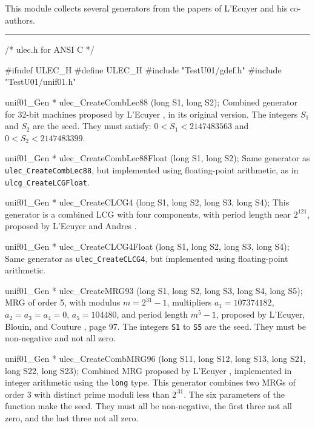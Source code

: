 
This module collects several generators from the papers of
L'Ecuyer and his co-authors.

\bigskip
\hrule
\code
\hide
/*  ulec.h  for ANSI C  */

#ifndef ULEC_H
#define ULEC_H
\endhide
#include "TestU01/gdef.h"
#include "TestU01/unif01.h"


unif01_Gen * ulec_CreateCombLec88 (long S1, long S2);
\endcode
 \tab  Combined generator for 32-bit machines proposed by
  L'Ecuyer \cite{rLEC88a}, in its original version.
%
  The integers $S_1$ and $S_2$ are the seed.
  They must satisfy: $0 < S_1 < 2147483563$ and $0 < S_2 < 2147483399$.
 \endtab
\code


unif01_Gen * ulec_CreateCombLec88Float (long S1, long S2);
\endcode
 \tab  Same generator as {\tt ulec\_CreateCombLec88},
  but implemented using floating-point arithmetic, as in
  {\tt ulcg\_CreateLCGFloat}.
 \endtab
\code


unif01_Gen * ulec_CreateCLCG4 (long S1, long S2, long S3, long S4);
\endcode
 \tab  This generator is a combined LCG with four components,
%
  with period length near $2^{121}$,
  proposed by L'Ecuyer and Andres \cite{rLEC97d}.
 \endtab
\code


unif01_Gen * ulec_CreateCLCG4Float (long S1, long S2, long S3, long S4);
\endcode
 \tab  Same generator as {\tt ulec\_CreateCLCG4},
  but implemented using floating-point arithmetic.
 \endtab
\code


unif01_Gen * ulec_CreateMRG93 (long S1, long S2, long S3, long S4, long S5);
\endcode
 \tab  MRG of order 5, with modulus $m=2^{31}-1$, multipliers
   $a_1 = 107374182$, $a_2 = a_3 = a_4 = 0$, $a_5 = 104480$,
   and period length $m^5-1$, proposed by
  L'Ecuyer, Blouin, and Couture \cite{rLEC93a}, page 97.
%
  The integers {\tt S1} to {\tt S5} are the seed.
  They must be non-negative and not all zero.
 \endtab
\code


unif01_Gen * ulec_CreateCombMRG96 (long S11, long S12, long S13,
                                   long S21, long S22, long S23);
\endcode
 \tab  Combined MRG proposed by L'Ecuyer \cite{rLEC96b}, implemented
   in integer arithmetic using the {\tt long} type.
   This generator combines two MRGs of order 3 with distinct prime
%
   moduli less than $2^{\,31}$.
   The six parameters of the function make the seed.
   They must all be non-negative, the first three not all zero,
   and the last three not all zero.
 \endtab
\code


